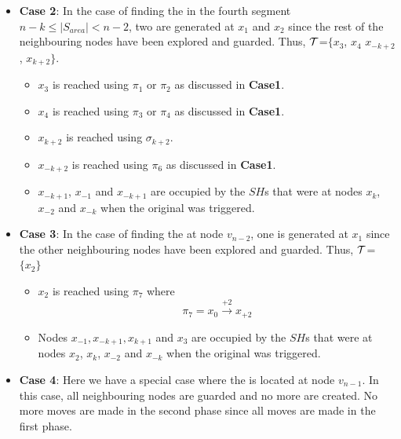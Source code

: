 \begin{itemize}
 \item {\bf Case 2}: In the case of finding the \bv in the fourth segment $n-k\leq |S_{area}| <n-2$, two \bvs are generated at $x_1$ and $x_2$  since the rest of the neighbouring nodes have been explored and guarded. Thus,
$\cal T$=$\{x_{3}$, $x_{4}$ $x_{-k+2}$, $x_{k+2}\}$.
\begin{itemize}
\item $x_3$ is reached using $\pi_1$ or $\pi_2$  as discussed in {\bf Case1}.
\item $x_{4}$ is reached using $\pi_3$ or $\pi_4$ as discussed in {\bf Case1}.

\item $x_{k+2}$ is reached using $\sigma_{k+2}$.
\item $x_{-k+2}$ is reached using $\pi_6$  as discussed in {\bf Case1}.

\item $x_{-k+1}$, $x_{-1}$  and $x_{-k+1}$ are occupied by the $SH$s that were at nodes $x_{k}$, $x_{-2}$ and $x_{-k}$ when the original \bv was triggered.
\end{itemize}



\item {\bf Case 3}: In the case of finding the \bv at node $v_{n-2}$, one \bv is generated  at $x_1$ since the other neighbouring nodes have been explored and guarded. Thus,
$\cal T$=$\{x_2\}$ 

\begin{itemize}
\item $x_2$ is reached using $\pi_7$ where
$$\pi_7 =  x_{0}\xrightarrow {+2}x_{+2} $$

\item Nodes $x_{-1},x_{-k+1},x_{k+1}$ and $x_{3}$ are occupied by the $SH$s that were at nodes $x_{2}$, $x_{k}$, $x_{-2}$ and $x_{-k}$ when the original \bv was triggered. 
\end{itemize}


\item {\bf Case 4}: Here we have a special case where the \bv is located at node $v_{n-1}$. In this case, all neighbouring nodes are guarded and no more \bvs are created. No more moves are made in the second phase since all moves are made in the first phase.





\end{itemize}
